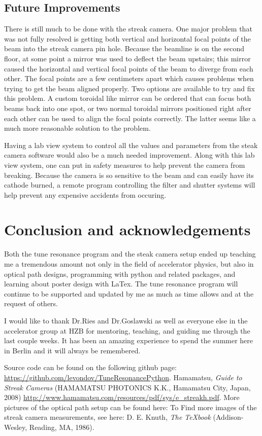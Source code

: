 \documentclass[%
 reprint,%
 amssymb, amsmath,%
 aip,cha,%
]{revtex4-1}
\begin{document}
\subsection{Future Improvements}
There is still much to be done with the streak camera. One major problem that was not fully resolved is getting both vertical and horizontal focal points of the beam into the streak camera pin hole. Because the beamline is on the second floor, at some point a mirror was used to deflect the beam upstairs; this mirror caused the horizontal and vertical focal points of the beam to diverge from each other. The focal points are a few centimeters apart which causes problems when trying to get the beam aligned properly. Two options are available to try and fix this problem. A custom toroidal like mirror can be ordered that can focus both beams back into one spot, or two normal toroidal mirrors positioned right after each other can be used to align the focal points correctly. The latter seems like a much more reasonable solution to the problem.

Having a lab view system to control all the values and parameters from the steak camera software would also be a much needed improvement. Along with this lab view system, one can put in safety measures to help prevent the camera from breaking. Because the camera is so sensitive to the beam and can easily have its cathode burned, a remote program controlling the filter and shutter systems will help prevent any expensive accidents from occuring.

\section{Conclusion and acknowledgements}
Both the tune resonance program and the steak camera setup ended up teaching me a tremendous amount not only in the field of accelerator physics, but also in optical path designs, programming with python and related packages, and learning about poster design with LaTex. The tune resonance program will continue to be supported and updated by me as much as time allows and at the request of others.

I would like to thank Dr.Ries and Dr.Goslawski as well as everyone else in the accelerator group at HZB for mentoring, teaching, and guiding me through the last couple weeks. It has been an amazing experience to spend the summer here in Berlin and it will always be remembered.


\begin{thebibliography}{9}\label{sec:TeXbooks}%
Source code can be found on the following github page: 
\url{https://github.com/levondov/TuneResonancePython}.
%
Hamamatsu,
\emph{Guide to Streak Cameras}
(HAMAMATSU PHOTONICS K.K., Hamamatsu City, Japan, 2008)
\url{http://www.hamamatsu.com/resources/pdf/sys/e_streakh.pdf}.
%
More pictures of the optical path setup can be found here:
%
To Find more images of the streak camera measurements, see here: 
%
D. E. Knuth, 
\emph{The \TeX book} 
(Addison-Wesley, Reading, MA, 1986). 

\end{thebibliography}
\end{document}
